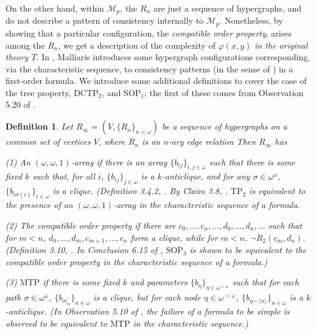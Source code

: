 \documentclass[12pt]{amsart}
\newtheorem{definition}{Definition}[section]
\theoremstyle{definition}
\begin{document}
On the other hand, within $\mathcal{M}_{p}$, the $R_{n}$ are just a sequence of hypergraphs, and do not describe a pattern of consistency internally to $\mathcal{M}_{p}$. Nonetheless, by showing that a particular configuration, the \textit{compatible order property}, arises among the $R_{n}$, we get a description of the complexity of $\varphi(x,y)$ \textit{in the original theory $T$}. In \cite{Mal10}, Malliaris introduces some hypergraph configurations corresponding, via the characteristic sequence, to consistency patterns (in the sense of \cite{GM22}) in a first-order formula. We introduce some additional definitions to cover the case of the tree property, $\mathrm{DCTP}_{2}$, and $\mathrm{SOP}_{1}$; the first of these comes from Observation 5.20 of \cite{Mal10}.

\begin{definition}
    Let $R_{\infty}=(V,\{R_{n}\}_{n < \omega})$ be a sequence of hypergraphs on a common set of vertices $V$, where $R_{n}$ is an $n$-ary edge relation Then $R_{\infty}$ has

    (1) An $(\omega, \omega, 1)$-array if there is an array $\{b_{ij}\}_{i, j \in \omega}$ such that there is some fixed $k$ such that, for all $i$, $\{b_{ij}\}_{j \in \omega}$ is a $k$-anticlique, and for any $\sigma \in \omega^{\omega}$, $\{ b_{i\sigma(i)}\}_{i \in \omega}$ is a clique. (Definition 3.4.2, \cite{Mal10}. By Claim 3.8, \cite{Mal10}, $\mathrm{TP}_{2}$ is equivalent to the presence of an $(\omega, \omega, 1)$-array in the characteristic sequence of a formula. 

    (2) The \emph{compatible order property} if there are $c_{0}, \ldots, c_{n}, \ldots, d_{0}, \ldots, d_{n}, \ldots$ such that for $m < n$, $d_{0}, \ldots, d_{m}, c_{m+1}, \ldots, c_{n}$ form a clique, while for $m < n$, $\neg R_{2}(c_{m}, d_{n})$. (Definition 3.10, \cite{Mal10}. In Conclusion 6.15 of \cite{Mal10}, $\mathrm{SOP}_{3}$ is shown to be equivalent to the compatible order property in the characteristic sequence of a formula.)

    (3) $\mathrm{MTP}$ if there is some fixed $k$ and parameters $\{b_{\eta}\}_{\eta \in \omega^{< \omega}}$ such that for each path $\sigma \in \omega^{\omega}$, $\{b_{\sigma|_{n} }\}_{n \in \omega}$ is a clique, but for each node $\eta \in \omega^{< \omega}$, $\{ b_{\eta \smallfrown \langle n \rangle }\}_{n \in \omega}$ is a $k$-anticlique. (In Observation 5.10 of \cite{Mal10}, the failure of a formula to be simple is observed to be equivalent to $\mathrm{MTP}$ in the characteristic sequence.)


\end{definition}
\end{document}

